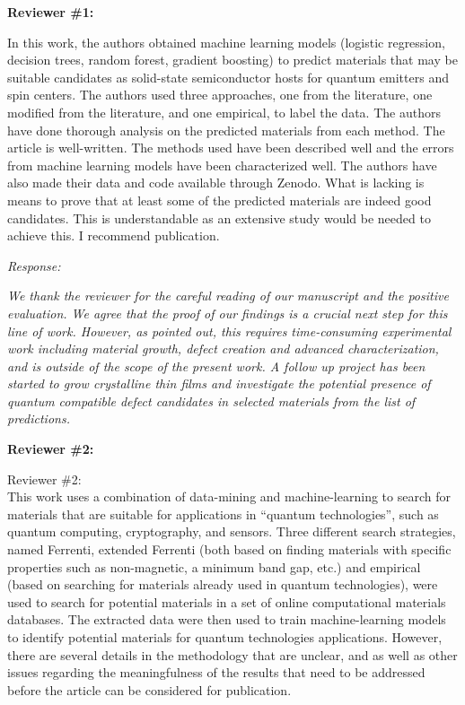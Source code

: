 \documentclass[11pt, a4paper]{letter} %
\begin{document}
\pagebreak
\noindent
\textbf{Reviewer \#1: }

In this work, the authors obtained machine learning models (logistic regression, decision trees, random forest, gradient boosting) to predict materials that may be suitable candidates as solid-state semiconductor hosts for quantum emitters and spin centers. The authors used three approaches, one from the literature, one modified from the literature, and one empirical, to label the data. The authors have done thorough analysis on the predicted materials from each method. The article is well-written. The methods used have been described well and the errors from machine learning models have been characterized well. The authors have also made their data and code available through Zenodo. What is lacking is means to prove that at least some of the predicted materials are indeed good candidates. This is understandable as an extensive study would be needed to achieve this. I recommend publication.  

\textit{Response: }  

\textit{We thank the reviewer for the careful reading of our manuscript and the positive evaluation. We agree that the proof of our findings is a crucial next step for this line of work. However, as pointed out, this requires time-consuming experimental work including material growth, defect creation and advanced characterization, and is outside of the scope of the present work. A follow up project has been started to grow crystalline thin films and investigate the potential presence of quantum compatible defect candidates in selected materials from the list of predictions. }

\pagebreak 
\noindent
\textbf{Reviewer \#2: }

Reviewer \#2: \\
This work uses a combination of data-mining and machine-learning to search for materials that are suitable for applications in “quantum technologies”, such as quantum computing, cryptography, and sensors. Three different search strategies, named Ferrenti, extended Ferrenti (both based on finding materials with specific properties such as non-magnetic, a minimum band gap, etc.) and empirical (based on searching for materials already used in quantum technologies), were used to search for potential materials in a set of online computational materials databases. The extracted data were then used to train machine-learning models to identify potential materials for quantum technologies applications. However, there are several details in the methodology that are unclear, and as well as other issues regarding the meaningfulness of the results that need to be addressed before the article can be considered for publication.
\end{document}
